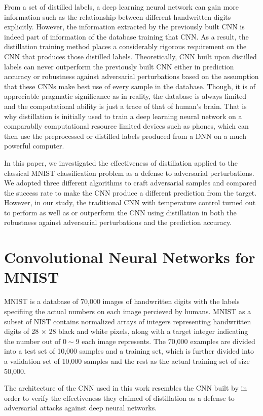 \documentclass{article}
\begin{document}
From a set of distilled labels, a deep learning neural network can gain more information such as the relationship between different handwritten digits explicitly. However, the information extracted by the previously built CNN is indeed part of information of the database training that CNN.
As a result, the distillation training method places a considerably rigorous requirement on the CNN that produces those distilled labels.
Theoretically, CNN built upon distilled labels can never outperform the previously built CNN either in prediction accuracy or robustness against adversarial perturbations based on the assumption that these CNNs make best use of every sample in the database. 
Though, it is of appreciable pragmatic significance as in reality, the database is always limited and the computational ability is just a trace of that of human's brain.
That is why distillation is initially used to train a deep learning neural network on a comparablly computational resource limited devices such as phones, which can then use the preprocessed or distilled labels produced from a DNN on a much powerful computer.

In this paper, we investigated the effectiveness of distillation applied to the classical MNIST classification problem as a defense to adversarial perturbations. We adopted three different algorithms to craft adversarial samples and compared the success rate to make the CNN produce a different prediction from the target.
However, in our study, the traditional CNN with temperature control turned out to perform as well as or outperform the CNN using distillation in both the robustness against adversarial perturbations and the prediction accuracy. 

\section{Convolutional Neural Networks for MNIST}
MNIST is a database of 70,000 images of handwritten digits with the labels specifiing the actual numbers on each image percieved by humans\cite{MNIST}. MNIST as a subset of NIST contains normalized arrays of integers representing handwritten digits of 28 $\times$ 28 black and white pixels, along with a target integer indicating the number out of $0\sim 9$ each image represents.
The 70,000 examples are divided into a test set of 10,000 samples and a training set, which is further divided into a validation set of 10,000 samples and the rest as the actual training set of size 50,000.

The architecture of the CNN used in this work resembles the CNN built by \cite{Papernot} in order to verify the effectiveness they claimed of distillation as a defense to adversarial attacks against deep neural networks.\cite{MNIST} 
\end{document}

